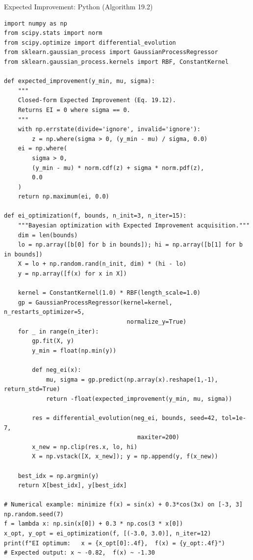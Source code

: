 \documentclass[aspectratio=169,10pt]{beamer}
\begin{document}
\begin{frame}[fragile]{Expected Improvement: Python (Algorithm 19.2)}
\begin{lstlisting}[caption={Expected Improvement acquisition — Python equivalent of Algorithm 19.2}]
import numpy as np
from scipy.stats import norm
from scipy.optimize import differential_evolution
from sklearn.gaussian_process import GaussianProcessRegressor
from sklearn.gaussian_process.kernels import RBF, ConstantKernel

def expected_improvement(y_min, mu, sigma):
    """
    Closed-form Expected Improvement (Eq. 19.12).
    Returns EI = 0 where sigma == 0.
    """
    with np.errstate(divide='ignore', invalid='ignore'):
        z = np.where(sigma > 0, (y_min - mu) / sigma, 0.0)
    ei = np.where(
        sigma > 0,
        (y_min - mu) * norm.cdf(z) + sigma * norm.pdf(z),
        0.0
    )
    return np.maximum(ei, 0.0)

def ei_optimization(f, bounds, n_init=3, n_iter=15):
    """Bayesian optimization with Expected Improvement acquisition."""
    dim = len(bounds)
    lo = np.array([b[0] for b in bounds]); hi = np.array([b[1] for b in bounds])
    X = lo + np.random.rand(n_init, dim) * (hi - lo)
    y = np.array([f(x) for x in X])

    kernel = ConstantKernel(1.0) * RBF(length_scale=1.0)
    gp = GaussianProcessRegressor(kernel=kernel, n_restarts_optimizer=5,
                                   normalize_y=True)
    for _ in range(n_iter):
        gp.fit(X, y)
        y_min = float(np.min(y))

        def neg_ei(x):
            mu, sigma = gp.predict(np.array(x).reshape(1,-1), return_std=True)
            return -float(expected_improvement(y_min, mu, sigma))

        res = differential_evolution(neg_ei, bounds, seed=42, tol=1e-7,
                                      maxiter=200)
        x_new = np.clip(res.x, lo, hi)
        X = np.vstack([X, x_new]); y = np.append(y, f(x_new))

    best_idx = np.argmin(y)
    return X[best_idx], y[best_idx]

# Numerical example: minimize f(x) = sin(x) + 0.3*cos(3x) on [-3, 3]
np.random.seed(7)
f = lambda x: np.sin(x[0]) + 0.3 * np.cos(3 * x[0])
x_opt, y_opt = ei_optimization(f, [(-3.0, 3.0)], n_iter=12)
print(f"EI optimum:   x = {x_opt[0]:.4f},  f(x) = {y_opt:.4f}")
# Expected output: x ~ -0.82,  f(x) ~ -1.30
\end{lstlisting}
\end{frame}
\end{document}
